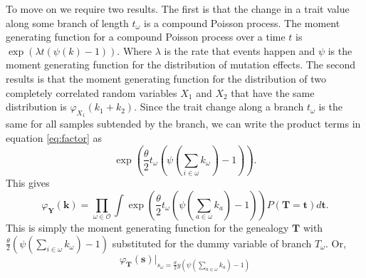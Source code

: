 To move on we require two results. The first is that the change in a
trait value along some branch of length $t_\omega$ is a compound
Poisson process. The moment generating function for a compound Poisson
process over a time $t$ is $\exp\left(\lambda t (\psi(k)-1)\right)$.
Where $\lambda$ is the rate that events happen and $\psi$ is the
moment generating function for the distribution of mutation effects.
The second results is that the moment generating function for the
distribution of two completely correlated random variables $X_1$ and
$X_2$ that have the same distribution is $\varphi_{X_1}(k_1+k_2)$. Since
the trait change along a branch $t_{\omega}$ is the same for all
samples subtended by the branch, we can write the product terms in
equation \ref{eq:factor} as
\begin{equation}
  \exp\left( \frac{\theta}{2} t_{\omega} \left( \psi\left(\sum_{i \in \omega}k_{\omega}\right) -1 \right)\right).
\end{equation}
This gives
\begin{equation}
  \varphi_{\mathbf{Y}}(\mathbf{k}) = \prod_{\omega \in \mathcal{O}}
  \int \exp\left( \frac{\theta}{2} t_{\omega} \left( \psi\left(\sum_{a \in \omega}k_{a}\right) -1 \right)\right)
  P(\mathbf{T}=\mathbf{t})d\mathbf{t}.
\end{equation}
This is simply the moment generating function for the genealogy
$\mathbf{T}$ with $\frac{\theta}{2} \left( \psi(\sum_{i \in
  \omega}k_{\omega}) -1 \right)$ substituted for the dummy variable of
branch $T_{\omega}$. Or,
\begin{equation}
  \label{eq:sub}
  \varphi_{\mathbf{T}}(\mathbf{s})\Bigr|_{s_{\omega}=\frac{\theta}{2}y \left( \psi\left(\sum_{a \in \omega}k_{a}\right) -1 \right)}
\end{equation}

